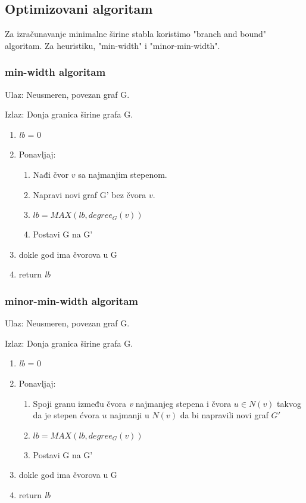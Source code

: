 \documentclass[10pt]{article}
\begin{document}
\subsection{Optimizovani algoritam}
Za izračunavanje minimalne širine stabla koristimo "branch and bound" algoritam. Za heuristiku, "min-width" i "minor-min-width".

\subsubsection{min-width algoritam}

Ulaz: Neusmeren, povezan graf G.

Izlaz: Donja granica širine grafa G.

\begin{enumerate}
    \item \textit{lb} = 0
    \item Ponavljaj:
    \begin{enumerate}
    \item Nađi čvor $v$ sa najmanjim stepenom.
    \item Napravi novi graf G' bez čvora $v$.
    \item $lb = MAX(lb, degree_G(v))$
    \item Postavi G na G'
    \end{enumerate}
    \item dokle god ima čvorova u G
    \item return \textit{lb}
\end{enumerate}

\subsubsection{minor-min-width algoritam}

Ulaz: Neusmeren, povezan graf G.

Izlaz: Donja granica širine grafa G.

\begin{enumerate}
    \item \textit{lb} = 0
    \item Ponavljaj:
    \begin{enumerate}
    \item Spoji granu između čvora \textit{v} najmanjeg stepena i čvora $u\in N(v)$ takvog da je stepen ćvora $u$ najmanji u $N(v)$ da bi napravili novi graf $G'$
    \item $lb = MAX(lb, degree_G(v))$
    \item Postavi G na G'
    \end{enumerate}
    \item dokle god ima čvorova u G
    \item return \textit{lb}
\end{enumerate}
\end{document}
